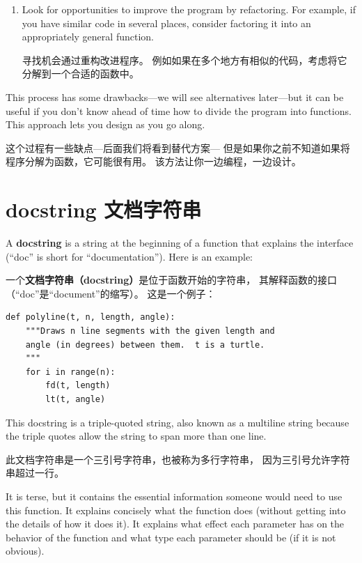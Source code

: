 \documentclass[10pt]{book}
\begin{document}
\begin{CJK}{UTF8}{gbsn}
\begin{enumerate}
\item Look for opportunities to improve the program by refactoring.
For example, if you have similar code in several places, consider
factoring it into an appropriately general function.

寻找机会通过重构改进程序。
例如如果在多个地方有相似的代码，考虑将它分解到一个合适的函数中。

\end{enumerate}

This process has some drawbacks---we will see alternatives later---but
it can be useful if you don't know ahead of time how to divide the
program into functions.  This approach lets you design as you go
along.

这个过程有一些缺点---后面我们将看到替代方案---
但是如果你之前不知道如果将程序分解为函数，它可能很有用。
该方法让你一边编程，一边设计。


\section{docstring 文档字符串}
\label{docstring}

A {\bf docstring} is a string at the beginning of a function that
explains the interface (``doc'' is short for ``documentation'').  Here
is an example:

一个{\bf 文档字符串（docstring）}是位于函数开始的字符串，
其解释函数的接口（``doc''是``document''的缩写）。
这是一个例子：

\begin{verbatim}
def polyline(t, n, length, angle):
    """Draws n line segments with the given length and
    angle (in degrees) between them.  t is a turtle.
    """    
    for i in range(n):
        fd(t, length)
        lt(t, angle)
\end{verbatim}
%
This docstring is a triple-quoted string, also known
as a multiline string because the triple quotes allow the string
to span more than one line.

此文档字符串是一个三引号字符串，也被称为多行字符串，
因为三引号允许字符串超过一行。

It is terse, but it contains the essential information
someone would need to use this function.  It explains concisely what
the function does (without getting into the details of how it does
it).  It explains what effect each parameter has on the behavior of
the function and what type each parameter should be (if it is not
obvious).


\end{CJK}
\end{document}
